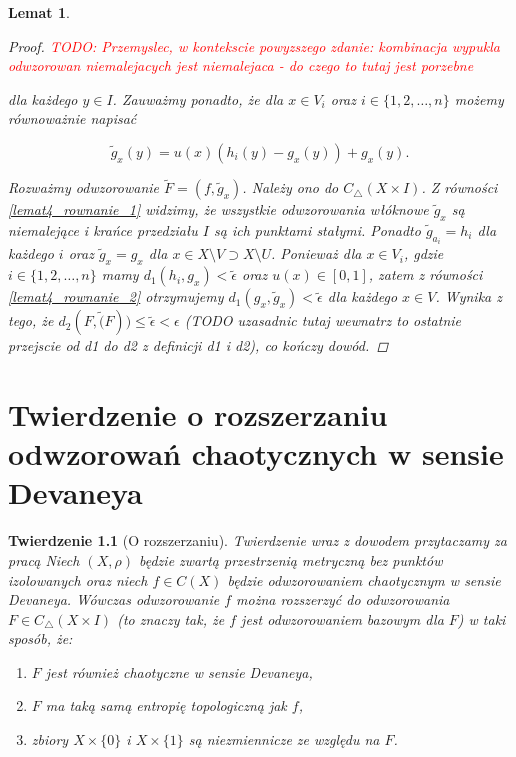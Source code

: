 \documentclass[licencjacka]{pwr_wmat_praca_dyplomowa}
\theoremstyle{plain}
\newtheorem{theorem}{Twierdzenie}
\numberwithin{theorem}{chapter}
\newtheorem{lemma}[theorem]{Lemat}
\theoremstyle{definition}
\numberwithin{theorem}{chapter}
\begin{document}
\begin{lemma}
\begin{proof}
\textcolor{red}{TODO: Przemyslec, w kontekscie powyzszego zdanie: kombinacja wypukla odwzorowan niemalejacych jest niemalejaca - do czego to tutaj jest porzebne}

dla każdego $y \in I$. Zauważmy ponadto, że dla $x \in V_i$ oraz $i \in \{1,2,\ldots,n\}$ możemy równoważnie napisać

\begin{equation} \label{lemat4_rownanie_2}
\widetilde{g}_x(y) = u(x)(h_i(y) - g_x(y)) + g_x(y).
\end{equation}

Rozważmy odwzorowanie $\widetilde{F} = (f, \widetilde{g}_x)$. Należy ono do $C_\triangle(X \times I)$. Z równości \ref{lemat4_rownanie_1} widzimy, że wszystkie odwzorowania włóknowe $\widetilde{g}_x$ są niemalejące i krańce przedziału $I$ są ich punktami stałymi. Ponadto $\widetilde{g}_{a_i} = h_i$ dla każdego $i$ oraz $\widetilde{g}_x = g_x$ dla $x \in X \setminus V \supset X \setminus U$. Ponieważ dla $x \in V_i$, gdzie $i \in \{1,2,\ldots,n\}$ mamy $d_1(h_i, g_x) < \widetilde{\epsilon}$ oraz $u(x) \in [0,1]$, zatem z równości \ref{lemat4_rownanie_2} otrzymujemy $d_1(g_x, \widetilde{g}_x) < \widetilde{\epsilon}$ dla każdego $x \in V$. Wynika z tego, że $d_2(F, \widetilde(F)) \leq \widetilde{\epsilon} < \epsilon$ (TODO uzasadnic tutaj wewnatrz to ostatnie przejscie od d1 do d2 z definicji d1 i d2), co kończy dowód.

\end{proof}

\end{lemma}



\chapter{Twierdzenie o rozszerzaniu odwzorowań chaotycznych w sensie Devaneya}
\begin{theorem}[O rozszerzaniu]\label{twierdzenie_glowne}
Twierdzenie wraz z dowodem przytaczamy za pracą \cite{balibrea2003topological}
Niech $(X, \rho)$ będzie zwartą przestrzenią metryczną bez punktów izolowanych oraz niech $f \in C(X)$ będzie odwzorowaniem chaotycznym w sensie Devaneya. Wówczas odwzorowanie $f$ można rozszerzyć do odwzorowania $F \in C_{\triangle}(X \times I)$ (to znaczy tak, że $f$ jest odwzorowaniem bazowym dla $F$) w taki sposób, że:
\begin{enumerate}[label=(\roman*)]
\item\label{twierdzenie_glowne_a} $F$ jest również chaotyczne w sensie Devaneya, 
\item\label{twierdzenie_glowne_b} $F$ ma taką samą entropię topologiczną jak $f$, 
\item\label{twierdzenie_glowne_c} zbiory $X \times \{0\}$ i $X \times \{1\}$ są niezmiennicze ze względu na $F$.
\end{enumerate}
\end{theorem}
\end{document}
